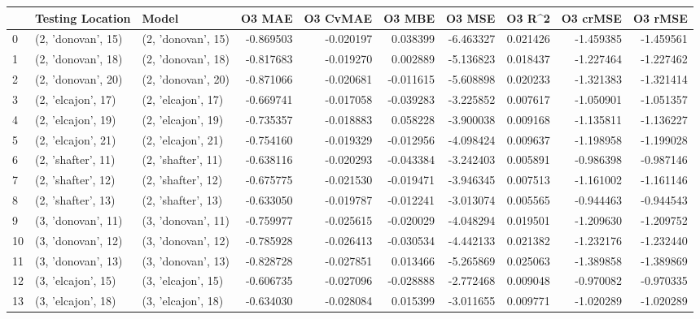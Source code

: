 \begin{tabular}{lllrrrrrrr}
\toprule
{} &    Testing Location &               Model &    O3 MAE &  O3 CvMAE &    O3 MBE &     O3 MSE &    O3 R\textasciicircum2 &  O3 crMSE &   O3 rMSE \\
\midrule
0  &  (2, 'donovan', 15) &  (2, 'donovan', 15) & -0.869503 & -0.020197 &  0.038399 &  -6.463327 &  0.021426 & -1.459385 & -1.459561 \\
1  &  (2, 'donovan', 18) &  (2, 'donovan', 18) & -0.817683 & -0.019270 &  0.002889 &  -5.136823 &  0.018437 & -1.227464 & -1.227462 \\
2  &  (2, 'donovan', 20) &  (2, 'donovan', 20) & -0.871066 & -0.020681 & -0.011615 &  -5.608898 &  0.020233 & -1.321383 & -1.321414 \\
3  &  (2, 'elcajon', 17) &  (2, 'elcajon', 17) & -0.669741 & -0.017058 & -0.039283 &  -3.225852 &  0.007617 & -1.050901 & -1.051357 \\
4  &  (2, 'elcajon', 19) &  (2, 'elcajon', 19) & -0.735357 & -0.018883 &  0.058228 &  -3.900038 &  0.009168 & -1.135811 & -1.136227 \\
5  &  (2, 'elcajon', 21) &  (2, 'elcajon', 21) & -0.754160 & -0.019329 & -0.012956 &  -4.098424 &  0.009637 & -1.198958 & -1.199028 \\
6  &  (2, 'shafter', 11) &  (2, 'shafter', 11) & -0.638116 & -0.020293 & -0.043384 &  -3.242403 &  0.005891 & -0.986398 & -0.987146 \\
7  &  (2, 'shafter', 12) &  (2, 'shafter', 12) & -0.675775 & -0.021530 & -0.019471 &  -3.946345 &  0.007513 & -1.161002 & -1.161146 \\
8  &  (2, 'shafter', 13) &  (2, 'shafter', 13) & -0.633050 & -0.019787 & -0.012241 &  -3.013074 &  0.005565 & -0.944463 & -0.944543 \\
9  &  (3, 'donovan', 11) &  (3, 'donovan', 11) & -0.759977 & -0.025615 & -0.020029 &  -4.048294 &  0.019501 & -1.209630 & -1.209752 \\
10 &  (3, 'donovan', 12) &  (3, 'donovan', 12) & -0.785928 & -0.026413 & -0.030534 &  -4.442133 &  0.021382 & -1.232176 & -1.232440 \\
11 &  (3, 'donovan', 13) &  (3, 'donovan', 13) & -0.828728 & -0.027851 &  0.013466 &  -5.265869 &  0.025063 & -1.389858 & -1.389869 \\
12 &  (3, 'elcajon', 15) &  (3, 'elcajon', 15) & -0.606735 & -0.027096 & -0.028888 &  -2.772468 &  0.009048 & -0.970082 & -0.970335 \\
13 &  (3, 'elcajon', 18) &  (3, 'elcajon', 18) & -0.634030 & -0.028084 &  0.015399 &  -3.011655 &  0.009771 & -1.020289 & -1.020289 \\

\end{tabular}
